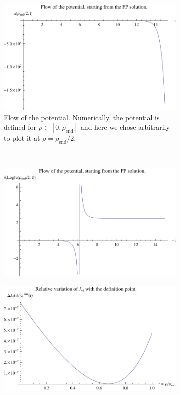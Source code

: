 \begin{figure}[htp]
\centering
\begin{subfigure}{1.\textwidth}
	\centering
	\includegraphics[width=.5\linewidth]{img/chap4/plotflowd3.pdf}
	\caption{Flow of the potential. Numerically, the potential is defined for $\rho \in [0, \rho_{\text{end}}]$ and here we chose arbitrarily to plot it at $\rho = \rho_{\text{end}}/2$.}
	\label{fig:plotflow}
	\end{subfigure}\\
\centering
\begin{subfigure}{.5\textwidth}
	\centering
	\includegraphics[width=.9\linewidth]{img/chap4/plotlogflowd3.pdf}
	\caption{}
	\label{fig:plotlogflow}
	\end{subfigure}%
\begin{subfigure}{.5\textwidth}
	\centering
	\includegraphics[width=.9\linewidth]{img/chap4/plotnud3.pdf}
	\caption{}
	\label{fig:plotnu}
\end{subfigure}
\caption{}
\label{fig:flow}
\end{figure}

